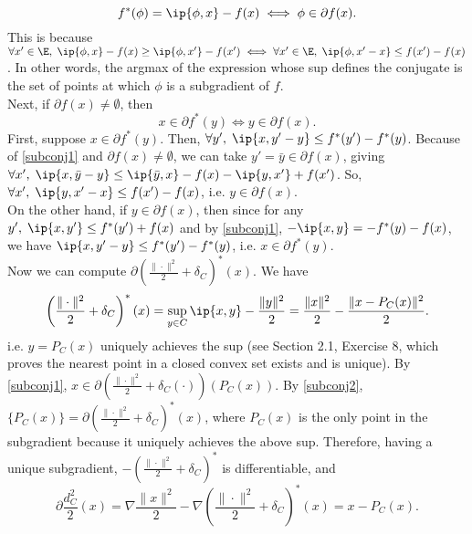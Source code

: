 \documentclass[../borwein-lewis_notes.tex]{subfiles}
\begin{document}
\begin{enumerate}[(a)]
\begin{enumerate}[(i),resume]
{\begin{equation}
\label{subconj1}
f^*(\phi) = \ip{\phi, x} - f(x) \iff \phi\in\partial f(x).
\end{equation}
This is because $\forall x'\in\E,\;\ip{\phi,x} - f(x) \geq 
\ip{\phi,x'} - f(x') \iff \forall x'\in\E,\; \ip{\phi, x'-x}
\leq f(x')-f(x)$. In other words, the argmax of the expression 
whose sup defines the conjugate is the set of points at which
$\phi$ is a subgradient of $f$. \\
Next, if $\partial f(x)\neq\emptyset$, then 
\begin{equation}
\label{subconj2}
x\in\partial f^*(y) 
\iff y\in\partial f(x).
\end{equation}
First, suppose $x\in\partial f^*(y)$. Then,
$\forall y',\;\ip{x,y'-y} \leq f^*(y') - f^*(y)$. Because of 
\eqref{subconj1} and $\partial f(x)\neq\emptyset$, we can take 
$y'=\bar y\in\partial f(x)$, giving
$\forall x',\;\ip{x,\bar y-y}
 \leq \ip{\bar y, x} - f(x) - \ip{y, x'} + f(x')$.
So, $\forall x',\; \ip{y, x'-x} \leq f(x')- f(x)$, i.e. $y\in\partial 
f(x)$. \\
On the other hand, if $y\in\partial f(x)$, 
then since for any $y',\; \ip{x,y'} \leq f^*(y') + f(x)$ and by 
\eqref{subconj1}, $-\ip{x,y} = -f^*(y) - f(x)$, we have 
$\ip{x, y'-y} \leq f^*(y') - f^*(y)$, i.e. $x\in\partial f^*(y)$.\\
Now we can compute $\partial\left(\frac{\|\cdot\|^2}{2} + \delta_C
\right)^*(x)$. We have 
\begin{equation*}
\left(\frac{\|\cdot\|^2}{2} + \delta_C\right)^*(x)
= \sup_{y\in C}\ip{x,y}- \frac{\|y\|^2}{2} = \frac{\|x\|^2}{2}
- \frac{\|x-P_C(x)\|^2}{2}.
\end{equation*}
i.e. $y=P_C(x)$ uniquely achieves the sup (see Section 2.1, 
Exercise 8, which proves the nearest point in a closed convex set 
exists and is unique). By \eqref{subconj1}, $x\in\partial\left(
\frac{\|\cdot\|^2}{2} + \delta_C(\cdot)\right)(P_C(x))$. 
By \eqref{subconj2}, $\{P_C(x)\}=\partial\left(\frac{\|\cdot\|^2}{2}
+ \delta_C\right)^*(x)$, where $P_C(x)$ is the only point in the 
subgradient because it uniquely achieves the above sup. Therefore, 
having a unique subgradient, $-\left(\frac{\|\cdot\|^2}{2}+\delta_C
\right)^*$ is differentiable, and
\begin{equation*}
\partial\frac{d_C^2}{2}(x) = \nabla\frac{\|x\|^2}{2} - \nabla 
\left(\frac{\|\cdot\|^2}{2} + \delta_C\right)^*(x) = x - P_C(x).
\end{equation*}
}
\end{enumerate}
\end{enumerate}
\end{document}
